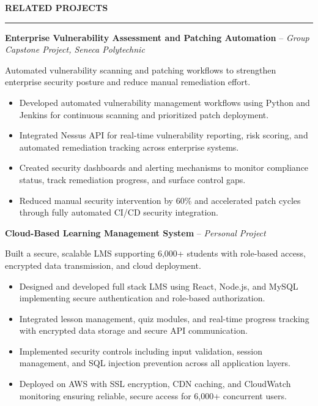 \documentclass[10pt,letterpaper]{article}
\begin{document}
\vspace{6pt}

\textbf{RELATED PROJECTS}\\[-8pt]
\noindent\rule{\textwidth}{1pt}

\vspace{-2pt}

\textbf{Enterprise Vulnerability Assessment and Patching Automation} -- \emph{Group Capstone Project, Seneca Polytechnic }

\vspace{-1pt}

Automated vulnerability scanning and patching workflows to strengthen enterprise security posture and reduce manual remediation effort.
\vspace{-1pt}
\begin{itemize}
\item Developed automated vulnerability management workflows using Python and Jenkins for continuous scanning and prioritized patch deployment.
\item Integrated Nessus API for real-time vulnerability reporting, risk scoring, and automated remediation tracking across enterprise systems.
\item Created security dashboards and alerting mechanisms to monitor compliance status, track remediation progress, and surface control gaps.
\item Reduced manual security intervention by 60\% and accelerated patch cycles through fully automated CI/CD security integration.
\end{itemize}

\textbf{Cloud-Based Learning Management System} -- \emph{Personal Project}

\vspace{-1pt}

Built a secure, scalable LMS supporting 6,000+ students with role-based access, encrypted data transmission, and cloud deployment.
\vspace{-1pt}
\begin{itemize}
\item Designed and developed full stack LMS using React, Node.js, and MySQL implementing secure authentication and role-based authorization.
\item Integrated lesson management, quiz modules, and real-time progress tracking with encrypted data storage and secure API communication.
\item Implemented security controls including input validation, session management, and SQL injection prevention across all application layers.
\item Deployed on AWS with SSL encryption, CDN caching, and CloudWatch monitoring ensuring reliable, secure access for 6,000+ concurrent users.
\end{itemize}
\end{document}
